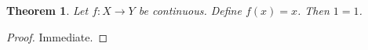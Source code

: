 \newtheorem{theorem}{Theorem}

\begin{theorem}\label{thm:callable-role-clean}
Let $f:X\to Y$ be continuous. Define $f(x)=x$. Then $1=1$.
\end{theorem}
\begin{proof}
Immediate.
\end{proof}
